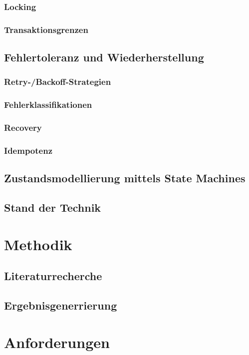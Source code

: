 \documentclass[11pt,a4paper]{scrreprt}
\begin{document}
    \subsection{Locking}
    \subsection{Transaktionsgrenzen}

    \section{Fehlertoleranz und Wiederherstellung}
    \subsection{Retry-/Backoff-Strategien}
    \subsection{Fehlerklassifikationen}
    \subsection{Recovery}
    \subsection{Idempotenz}

    \section{Zustandsmodellierung mittels State Machines}
    \section{Stand der Technik}

    \chapter{Methodik}
    \section{Literaturrecherche}
    \section{Ergebnisgenerrierung}

    \chapter{Anforderungen}
\end{document}

